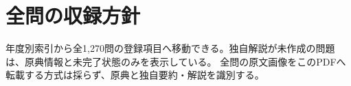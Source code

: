 \chapter{全問の収録方針}
年度別索引から全1,270問の登録項目へ移動できる。独自解説が未作成の問題は、原典情報と未完了状態のみを表示している。
全問の原文画像をこのPDFへ転載する方式は採らず、原典と独自要約・解説を識別する。
